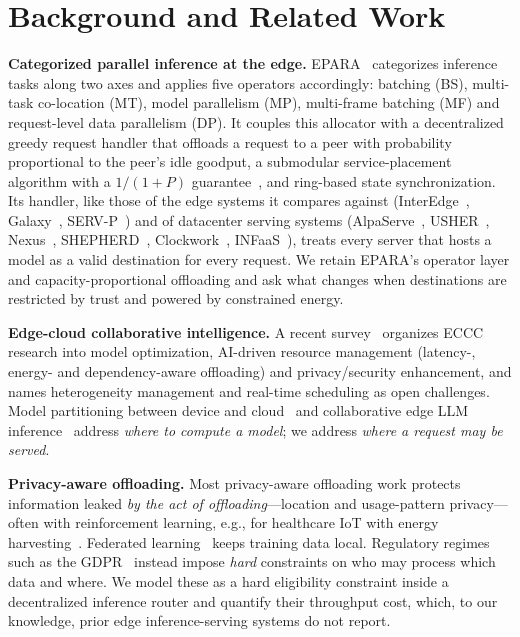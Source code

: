 \documentclass[journal]{IEEEtran}
\begin{document}
\section{Background and Related Work}\label{sec:related}

\textbf{Categorized parallel inference at the edge.}
EPARA~\cite{epara2025} categorizes inference tasks along two axes and applies five operators accordingly: batching (BS), multi-task co-location (MT), model parallelism (MP), multi-frame batching (MF) and request-level data parallelism (DP). It couples this allocator with a decentralized greedy request handler that offloads a request to a peer with probability proportional to the peer's idle goodput, a submodular service-placement algorithm with a $1/(1+P)$ guarantee~\cite{fisher1978submodular}, and ring-based state synchronization. Its handler, like those of the edge systems it compares against (InterEdge~\cite{interedge}, Galaxy~\cite{galaxy}, SERV-P~\cite{servp}) and of datacenter serving systems (AlpaServe~\cite{alpaserve}, USHER~\cite{usher}, Nexus~\cite{nexus}, SHEPHERD~\cite{shepherd}, Clockwork~\cite{clockwork}, INFaaS~\cite{infaas}), treats every server that hosts a model as a valid destination for every request. We retain EPARA's operator layer and capacity-proportional offloading and ask what changes when destinations are restricted by trust and powered by constrained energy.

\textbf{Edge-cloud collaborative intelligence.}
A recent survey~\cite{liu2025eccc} organizes ECCC research into model optimization, AI-driven resource management (latency-, energy- and dependency-aware offloading) and privacy/security enhancement, and names heterogeneity management and real-time scheduling as open challenges. Model partitioning between device and cloud~\cite{neurosurgeon} and collaborative edge LLM inference~\cite{edgeshard} address \emph{where to compute a model}; we address \emph{where a request may be served}.

\textbf{Privacy-aware offloading.}
Most privacy-aware offloading work protects information leaked \emph{by the act of offloading}---location and usage-pattern privacy---often with reinforcement learning, e.g., for healthcare IoT with energy harvesting~\cite{min2019privacy}. Federated learning~\cite{mcmahan2017fl} keeps training data local. Regulatory regimes such as the GDPR~\cite{gdpr} instead impose \emph{hard} constraints on who may process which data and where. We model these as a hard eligibility constraint inside a decentralized inference router and quantify their throughput cost, which, to our knowledge, prior edge inference-serving systems do not report.
\end{document}
